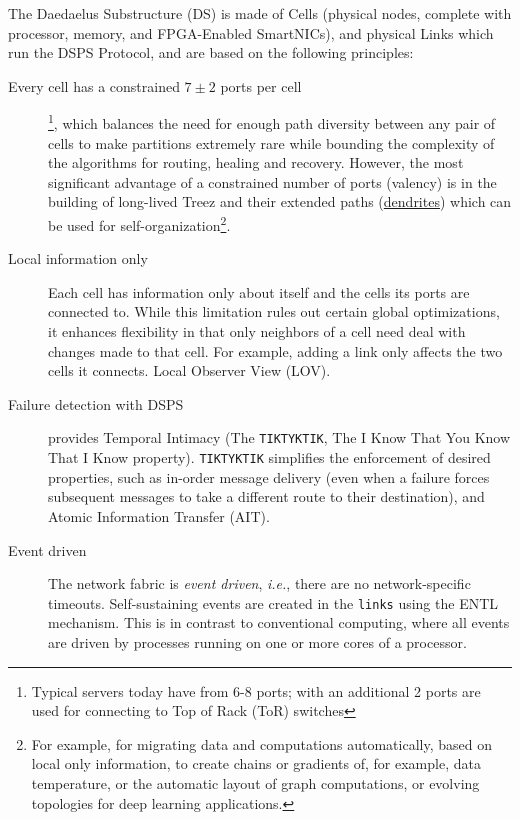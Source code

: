 \documentclass[../OAE-SPEC-MAIN.tex]{subfiles}
\begin{document}
The Daedaelus Substructure (DS) is made of Cells (physical nodes, complete with processor, memory, and FPGA-Enabled SmartNICs), and physical Links which run the DSPS Protocol, and are based on the following principles:

\begin{description}

	\item [Every cell has a constrained $7 \pm 2$ ports per cell]\footnote{Typical servers today have from 6-8 ports; with an additional 2 ports are used for connecting to Top of Rack (ToR) switches}, %
	which balances the need for enough path diversity between any pair of cells to make partitions extremely rare while bounding the complexity of the algorithms for routing, healing and recovery.  However, the most significant advantage of a constrained number of ports (valency) is in the building of long-lived Treez and their extended paths (\href{https://en.wikipedia.org/wiki/Dendrite}{dendrites}) which can be used for self-organization\footnote{For example, for migrating data and computations automatically, based on local only information, to create chains or gradients of, for example, data temperature, or the automatic layout of graph computations, or evolving topologies for deep learning applications.}. 

	\item [Local information only] Each cell has information only about itself and the cells its ports are connected to.  While this limitation rules out certain global optimizations, it enhances flexibility in that only neighbors of a cell need deal with changes made to that cell.  For example, adding a link only affects the two cells it connects. Local Observer View (LOV).

	\item [Failure detection with DSPS]  provides Temporal Intimacy (The \texttt{TIK\hspace{1pt}TYK\hspace{1pt}TIK}, The I Know That You Know That I Know property).   \texttt{TIK\hspace{1pt}TYK\hspace{1pt}TIK} simplifies the enforcement of desired properties, such as in-order message delivery (even when a failure forces subsequent messages to take a different route to their destination), and Atomic Information Transfer (AIT).

	\item [Event driven] The network fabric is \emph{event driven}, \emph{i.e.}, there are no network-specific timeouts. Self-sustaining events are created in the \texttt{links} using the ENTL mechanism. This is in contrast to conventional computing, where all events are driven by processes running on one or more cores of a processor.


\end{description}
\end{document}
